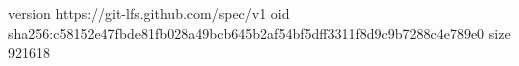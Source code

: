 version https://git-lfs.github.com/spec/v1
oid sha256:c58152e47fbde81fb028a49bcb645b2af54bf5dff3311f8d9c9b7288c4e789e0
size 921618
